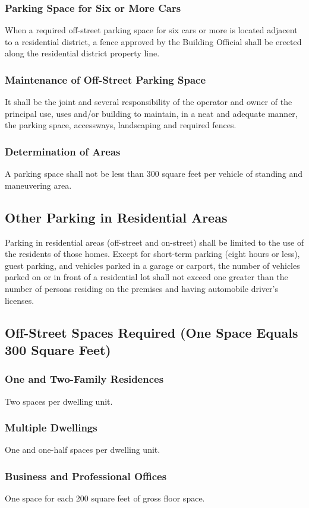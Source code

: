 \subsubsection{Parking Space for Six or More Cars}
When a required off-street parking space for six cars or more is located adjacent to a residential district, a fence approved by the Building Official shall be erected along the residential district property line.
\subsubsection{Maintenance of Off-Street Parking Space}
It shall be the joint and several responsibility of the operator and owner of the principal use, uses and/or building to maintain, in a neat and adequate manner, the parking space, accessways, landscaping and required fences.
\subsubsection{Determination of Areas}
A parking space shall not be less than 300 square feet per vehicle of standing and maneuvering area.
\subsection{Other Parking in Residential Areas}
Parking in residential areas (off-street and on-street) shall be limited to the use of the residents of those homes. Except for short-term parking (eight hours or less), guest parking, and vehicles parked in a garage or carport, the number of vehicles parked on or in front of a residential lot shall not exceed one greater than the number of persons residing on the premises and having automobile driver’s licenses.
\subsection{Off-Street Spaces Required (One Space Equals 300 Square Feet)}
\subsubsection{One and Two-Family Residences}
Two spaces per dwelling unit.
\subsubsection{Multiple Dwellings}
One and one-half spaces per dwelling unit.
\subsubsection{Business and Professional Offices}
One space for each 200 square feet of gross floor space.
